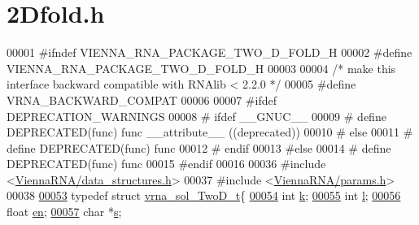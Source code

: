 \hypertarget{2Dfold_8h_source}{}\section{2\+Dfold.h}
\label{2Dfold_8h_source}

\begin{DoxyCode}
00001 \textcolor{preprocessor}{#ifndef VIENNA\_RNA\_PACKAGE\_TWO\_D\_FOLD\_H}
00002 \textcolor{preprocessor}{#define VIENNA\_RNA\_PACKAGE\_TWO\_D\_FOLD\_H}
00003 
00004 \textcolor{comment}{/* make this interface backward compatible with RNAlib < 2.2.0 */}
00005 \textcolor{preprocessor}{#define VRNA\_BACKWARD\_COMPAT}
00006 
00007 \textcolor{preprocessor}{#ifdef DEPRECATION\_WARNINGS}
00008 \textcolor{preprocessor}{# ifdef \_\_GNUC\_\_}
00009 \textcolor{preprocessor}{#  define DEPRECATED(func) func \_\_attribute\_\_ ((deprecated))}
00010 \textcolor{preprocessor}{# else}
00011 \textcolor{preprocessor}{#  define DEPRECATED(func) func}
00012 \textcolor{preprocessor}{# endif}
00013 \textcolor{preprocessor}{#else}
00014 \textcolor{preprocessor}{# define DEPRECATED(func) func}
00015 \textcolor{preprocessor}{#endif}
00016 
00036 \textcolor{preprocessor}{#include <\mbox{\hyperlink{data__structures_8h}{ViennaRNA/data\_structures.h}}>}
00037 \textcolor{preprocessor}{#include <\mbox{\hyperlink{params_8h}{ViennaRNA/params.h}}>}
00038 
\mbox{\hyperlink{group__kl__neighborhood__mfe}{00053}} \textcolor{keyword}{typedef} \textcolor{keyword}{struct }\mbox{\hyperlink{group__kl__neighborhood__mfe_structvrna__sol__TwoD__t}{vrna\_sol\_TwoD\_t}}\{
\mbox{\hyperlink{group__kl__neighborhood__mfe_ac111e850bb3b3a11b6b5707912cfa1b8}{00054}}   \textcolor{keywordtype}{int} \mbox{\hyperlink{group__kl__neighborhood__mfe_ac111e850bb3b3a11b6b5707912cfa1b8}{k}};          
\mbox{\hyperlink{group__kl__neighborhood__mfe_ab8e95cd920901175a2cc8de726ab1d36}{00055}}   \textcolor{keywordtype}{int} \mbox{\hyperlink{group__kl__neighborhood__mfe_ab8e95cd920901175a2cc8de726ab1d36}{l}};          
\mbox{\hyperlink{group__kl__neighborhood__mfe_a7577863a6a84224dfee39b321c03cab1}{00056}}   \textcolor{keywordtype}{float} \mbox{\hyperlink{group__kl__neighborhood__mfe_a7577863a6a84224dfee39b321c03cab1}{en}};       
\mbox{\hyperlink{group__kl__neighborhood__mfe_ac5942d2505a6cd7e4a8073a321d5d2d5}{00057}}   \textcolor{keywordtype}{char} *\mbox{\hyperlink{group__kl__neighborhood__mfe_ac5942d2505a6cd7e4a8073a321d5d2d5}{s}};        

\end{DoxyCode}
